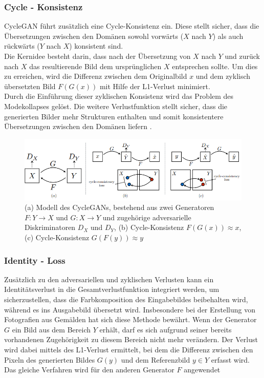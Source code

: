 \subsubsection{Cycle - Konsistenz}
CycleGAN führt zusätzlich eine Cycle-Konsistenz ein. Diese stellt sicher, dass die Übersetzungen zwischen den Domänen sowohl vorwärts ($X$ nach $Y$) als auch rückwärts ($Y$ nach $X$) konsistent sind.
\\
Die Kernidee besteht darin, dass nach der Übersetzung von $X$ nach $Y$ und zurück nach $X$ das resultierende Bild dem ursprünglichen $X$ entsprechen sollte. Um dies zu erreichen, wird die Differenz zwischen dem Originalbild $x$ und dem zyklisch übersetzten Bild $F(G(x))$ mit Hilfe der L1-Verlust minimiert. 
\\
Durch die Einführung dieser zyklischen Konsistenz wird das Problem des Modekollapses gelöst. Die weitere Verlustfunktion stellt sicher, dass die generierten Bilder mehr Strukturen enthalten und somit konsistentere Übersetzungen zwischen den Domänen liefern \cite{Zhu.2017}.

\begin{figure}[ht]
	\centering
	\includegraphics[width=1\linewidth]{./images/cycle_consistency_loss.png}
	\caption{(a) Modell des CycleGANs, bestehend aus zwei Generatoren $F:Y\rightarrow X$ und $G:X \rightarrow Y$ und zugehörige adversarielle Diskriminatoren $D_X$ und $D_Y$,
     (b) Cycle-Konsistenz $F(G(x))\approx x$,
     (c) Cycle-Konsistenz $G(F(y))\approx y$\cite{Zhu.2017}}
	\label{fig:cycleConsistency}
\end{figure}

\subsubsection{Identity - Loss}
Zusätzlich zu den adversariellen und zyklischen Verlusten kann ein Identitätsverlust in die Gesamtverlustfunktion integriert werden, um sicherzustellen, dass die Farbkomposition des Eingabebildes beibehalten wird, während es ins Ausgabebild übersetzt wird. Insbesondere bei der Erstellung von Fotografien aus Gemälden hat sich diese Methode bewährt.  
Wenn der Generator $G$ ein Bild aus dem Bereich $Y$ erhält, darf es sich aufgrund seiner bereits vorhandenen Zugehörigkeit zu diesem Bereich nicht mehr verändern. 
Der Verlust wird dabei mittels des L1-Verlust ermittelt, bei dem die Differenz zwischen den Pixeln des generierten Bildes $G(y)$ und dem Referenzbild $y\in Y$ erfasst wird. Das gleiche Verfahren wird für den anderen Generator $F$ angewendet \cite{Zhu.2017}

